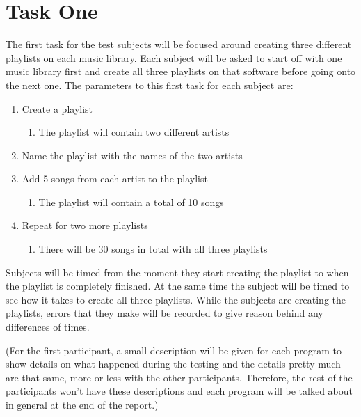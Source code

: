 \documentclass{article}
\begin{document}
\section{Task One}
The first task for the test subjects will be focused around creating three different playlists on each music library. Each subject will be asked to start off with one music library first and create all three playlists on that software before going onto the next one. The parameters to this first task for each subject are:


\begin{enumerate}
  \item Create a playlist
  \begin{enumerate}
    \item The playlist will contain two different artists
  \end{enumerate}
  \item Name the playlist with the names of the two artists
  \item Add 5 songs from each artist to the playlist
  \begin{enumerate}
    \item The playlist will contain a total of 10 songs 
  \end{enumerate}
  \item Repeat for two more playlists
  \begin{enumerate}
    \item There will be 30 songs in total with all three playlists
  \end{enumerate} 
\end{enumerate}

Subjects will be timed from the moment they start creating the playlist to when the playlist is completely finished. At the same time the subject will be timed to see how it takes to create all three playlists. While the subjects are creating the playlists, errors that they make will be recorded to give reason behind any differences of times.

(For the first participant, a small description will be given for each program to show details on what happened during the testing and the details pretty much are that same, more or less with the other participants. Therefore, the rest of the participants won't have these descriptions and each program will be talked about in general at the end of the report.) 
\end{document}
